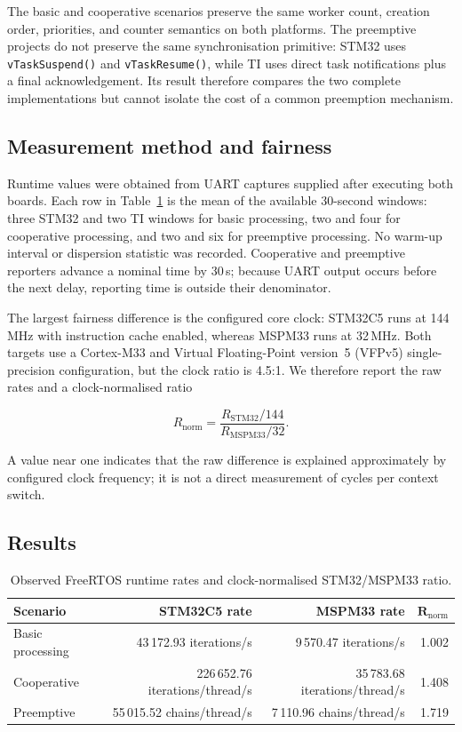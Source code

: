 The basic and cooperative scenarios preserve the same worker count, creation order, priorities,
and counter semantics on both platforms. The preemptive projects do not preserve the same
synchronisation primitive: STM32 uses \texttt{vTaskSuspend()} and \texttt{vTaskResume()}, while
TI uses direct task notifications plus a final acknowledgement. Its result therefore compares
the two complete implementations but cannot isolate the cost of a common preemption mechanism.

\subsection{Measurement method and fairness}
\label{subsec:ti-freertos-method}

Runtime values were obtained from UART captures supplied after executing both boards. Each row
in Table~\ref{tab:ti-freertos-runtime} is the mean of the available 30-second windows: three
STM32 and two TI windows for basic processing, two and four for cooperative processing, and two
and six for preemptive processing. No warm-up interval or dispersion statistic was recorded.
Cooperative and preemptive reporters advance a nominal time by 30\,s; because UART output occurs
before the next delay, reporting time is outside their denominator.

The largest fairness difference is the configured core clock: STM32C5 runs at 144\,MHz with
instruction cache enabled, whereas MSPM33 runs at 32\,MHz. Both targets use a Cortex-M33 and
Virtual Floating-Point version~5 (VFPv5) single-precision configuration, but the clock ratio is
4.5:1. We therefore report the raw rates and a clock-normalised ratio

\[
R_{\mathrm{norm}} = \frac{R_{\mathrm{STM32}}/144}{R_{\mathrm{MSPM33}}/32}.
\]

A value near one indicates that the raw difference is explained approximately by configured
clock frequency; it is not a direct measurement of cycles per context switch.

\subsection{Results}
\label{subsec:ti-freertos-results}

\begin{table}[H]
\centering
\caption{Observed FreeRTOS runtime rates and clock-normalised STM32/MSPM33 ratio.}
\label{tab:ti-freertos-runtime}
\begin{tabular}{l r r r}
\toprule
\textbf{Scenario} & \textbf{STM32C5 rate} & \textbf{MSPM33 rate} & $\boldsymbol{R_{\mathrm{norm}}}$ \\
\midrule
Basic processing & 43\,172.93 iterations/s & 9\,570.47 iterations/s & 1.002 \\
Cooperative & 226\,652.76 iterations/thread/s & 35\,783.68 iterations/thread/s & 1.408 \\
Preemptive & 55\,015.52 chains/thread/s & 7\,110.96 chains/thread/s & 1.719 \\
\bottomrule
\end{tabular}
\end{table}

